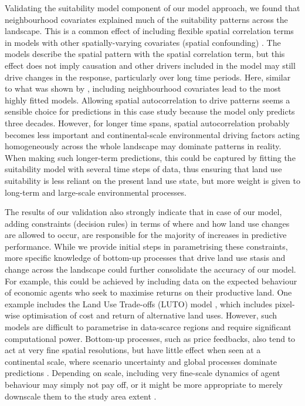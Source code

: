 \documentclass[titlesmallcaps,copyrightpage]{uomthesis}\usepackage[]{graphicx}\usepackage[]{color}
\begin{document}
Validating the suitability model component of our model approach, we
found that neighbourhood covariates explained much of the suitability
patterns across the landscape. This is a common effect of including
flexible spatial correlation terms in models with other
spatially-varying covariates (spatial confounding)
\citep{hodges_adding_2010}. The models describe the spatial pattern with
the spatial correlation term, but this effect does not imply causation
and other drivers included in the model may still drive changes in the
response, particularly over long time periods. Here, similar to what was
shown by \citet{dendoncker_spatial_2007}, including neighbourhood
covariates lead to the most highly fitted models. Allowing spatial
autocorrelation to drive patterns seems a sensible choice for
predictions in this case study because the model only predicts three
decades. However, for longer time spans, spatial autocorrelation
probably becomes less important and continental-scale environmental
driving factors acting homogeneously across the whole landscape may
dominate patterns in reality. When making such longer-term predictions,
this could be captured by fitting the suitability model with several
time steps of data, thus ensuring that land use suitability is less
reliant on the present land use state, but more weight is given to
long-term and large-scale environmental processes.

The results of our validation also strongly indicate that in case of our
model, adding constraints (decision rules) in terms of where and how
land use changes are allowed to occur, are responsible for the majority
of increases in predictive performance. While we provide initial steps
in parametrising these constraints, more specific knowledge of bottom-up
processes that drive land use stasis and change across the landscape
could further consolidate the accuracy of our model. For example, this
could be achieved by including data on the expected behaviour of
economic agents who seek to maximise returns on their productive land.
One example includes the Land Use Trade-offs (LUTO) model
\citep{bryan_supply_2014, connor_modelling_2015}, which includes
pixel-wise optimisation of cost and return of alternative land uses.
However, such models are difficult to parametrise in data-scarce regions
and require significant computational power. Bottom-up processes, such
as price feedbacks, also tend to act at very fine spatial resolutions,
but have little effect when seen at a continental scale, where scenario
uncertainty and global processes dominate predictions
\citep{connor_modelling_2015}. Depending on scale, including very
fine-scale dynamics of agent behaviour may simply not pay off, or it
might be more appropriate to merely downscale them to the study area
extent \citep{van_asselen_land_2013, connor_modelling_2015}.
\end{document}
